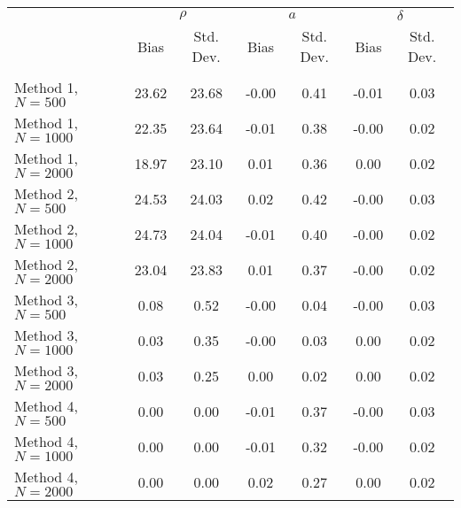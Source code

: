 \begin{tabular}{lcccccc} \\\toprule
 & \multicolumn{2}{c}{$\rho$} & \multicolumn{2}{c}{$a$} & \multicolumn{2}{c}{$\delta$} \\ 
 & Bias & Std. Dev. & Bias & Std. Dev. & Bias & Std. Dev. \\
\cmidrule(r){2-3}\cmidrule(r){4-5}\cmidrule(r){6-7} \\
Method 1, $N=500$ & 23.62 & 23.68 & -0.00 & 0.41 & -0.01 & 0.03\\
Method 1, $N=1000$ & 22.35 & 23.64 & -0.01 & 0.38 & -0.00 & 0.02\\
Method 1, $N=2000$ & 18.97 & 23.10 & 0.01 & 0.36 & 0.00 & 0.02\\
Method 2, $N=500$ & 24.53 & 24.03 & 0.02 & 0.42 & -0.00 & 0.03\\
Method 2, $N=1000$ & 24.73 & 24.04 & -0.01 & 0.40 & -0.00 & 0.02\\
Method 2, $N=2000$ & 23.04 & 23.83 & 0.01 & 0.37 & -0.00 & 0.02\\
Method 3, $N=500$ & 0.08 & 0.52 & -0.00 & 0.04 & -0.00 & 0.03\\
Method 3, $N=1000$ & 0.03 & 0.35 & -0.00 & 0.03 & 0.00 & 0.02\\
Method 3, $N=2000$ & 0.03 & 0.25 & 0.00 & 0.02 & 0.00 & 0.02\\
Method 4, $N=500$ & 0.00 & 0.00 & -0.01 & 0.37 & -0.00 & 0.03\\
Method 4, $N=1000$ & 0.00 & 0.00 & -0.01 & 0.32 & -0.00 & 0.02\\
Method 4, $N=2000$ & 0.00 & 0.00 & 0.02 & 0.27 & 0.00 & 0.02\\
\bottomrule\end{tabular}